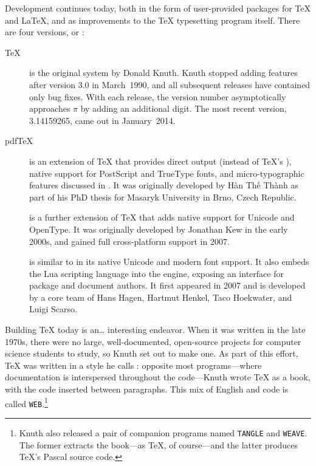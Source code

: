Development continues today,
both in the form of user-provided packages for \TeX{} and \LaTeX{},
and as improvements to the \TeX{} typesetting program itself.
There are four versions, or :
\begin{description}
\item[\TeX] is the original system by Donald Knuth.
Knuth stopped adding features after version 3.0 in March~1990,
and all subsequent releases have contained only bug fixes.
With each release, the version number asymptotically approaches $\pi$
by adding an additional digit.
The most recent version, 3.14159265, came out in January~2014.

\item[pdf\TeX] is an extension of \TeX{} that provides direct 
    output (instead of \TeX's ),
    native support for PostScript
    and TrueType fonts,
    and micro-typographic features discussed in .
    It was originally developed by
    Hàn Thế Thành
    as part of his PhD thesis
    for Masaryk University in Brno, Czech Republic.\punckern{}

\item[\XeTeX] is a further extension of \TeX{} that adds native support for
    Unicode and OpenType.
    It was originally developed by Jonathan Kew in the early 2000s,
    and gained full cross-platform support in 2007.\punckern{}

\item[\LuaTeX] is similar to \XeTeX{} in its native Unicode and modern font support.
    It also embeds the Lua scripting language into the engine,
    exposing an interface for package and document authors.
    It first appeared in 2007 and is developed by a core team of
    Hans Hagen, Hartmut Henkel, Taco Hoekwater,
    and Luigi Scarso.\punckern{}
\end{description}

Building \TeX{} today is an\dots{} interesting endeavor.
When it was written in the late 1970s,
there were no large, well-documented, open-source projects for computer science
students to study,
so Knuth set out to make one.
As part of this effort, \TeX{} was written in a style he calls
: opposite most programs---where
documentation is interspersed throughout the code---Knuth wrote \TeX{} as a book,
with the code inserted between paragraphs.
This mix of English and code is called \texttt{WEB}.\punckern\footnote{Knuth
also released a pair of companion programs named
\texttt{TANGLE} and \texttt{WEAVE}.
The former extracts the book---as \TeX, of course---and the latter
produces \TeX's Pascal source code.}

